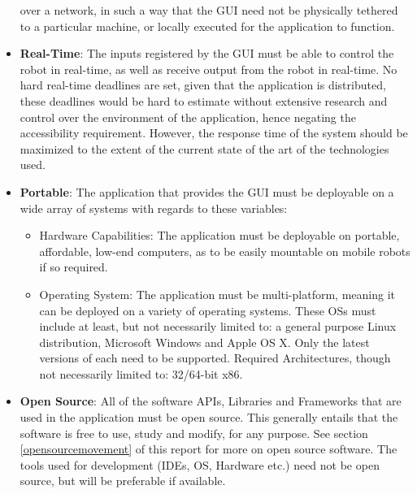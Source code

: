 \begin{itemize}
	over a network, in such a way that the GUI need not be physically tethered to a particular machine, or locally executed 
	for the application to function.
	\item \textbf{Real-Time}: The inputs registered by the GUI must be able to control the robot in real-time, as well as 
	receive output from the robot in real-time. No hard real-time deadlines are set, given that the application is 
	distributed, these deadlines would be hard to estimate without extensive research and control over the environment of 
	the application, hence negating the accessibility requirement. However, the response time of the system should be 
	maximized to the extent of the current state of the art of the technologies used.
	\item \textbf{Portable}: The application that provides the GUI must be deployable on a wide array of systems with 
	regards to these variables:\\
		\begin{itemize}
			\item Hardware Capabilities: The application must be deployable on portable, affordable, low-end computers, as 
			to be easily mountable on mobile robots if so required.
			\item Operating System: The application must be multi-platform, meaning it can be deployed on a variety of 
			operating systems. These OSs must include at least, but not necessarily limited to: a general purpose Linux 
			distribution, Microsoft Windows and Apple OS X. Only the latest versions of each need to be supported. Required 
			Architectures, though not necessarily limited to: 32/64-bit x86.\\
		\end{itemize}
	\item \textbf{Open Source}: All of the software APIs, Libraries and Frameworks that are used in the application must be 
	open source. This generally entails that the software is free to use, study and modify, for any purpose. See section 
	\ref{opensourcemovement} of this report for more on open source software. The tools used for development (IDEs, OS, 
	Hardware etc.) need not be open source, but will be preferable if available.\\
\end{itemize}

